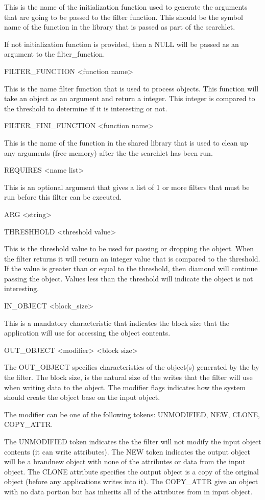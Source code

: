 This is the name of the initialization function used
to generate the arguments that are going to be passed to
the filter function.  This should be the symbol name of the 
function in the library that is passed as part of the searchlet.

If not initialization function is provided, then a
NULL will be passed as an argument to the filter_function.

FILTER_FUNCTION <function name>

This is the name filter function that is used
to process objects.  This function will take an 
object as an argument and return a integer.  This 
integer is compared to the threshold to determine if it
is interesting or not.


FILTER_FINI_FUNCTION <function name>

This is the name of the function in the shared library that is used
to clean up any arguments (free memory) after the the searchlet
has been run.  


REQUIRES <name list>

This is an optional argument that gives a list of 1 or more
filters that must be run before this filter can be executed.

ARG	<string>




THRESHHOLD  <threshold value>

This is the threshold value to be used for passing or dropping the object.
When the filter returns it will return an integer value that is compared
to the threshold.  If the value is greater than or equal to the threshold,
then diamond will continue passing the object.  Values less than
the threshold will indicate the object is not interesting.


IN_OBJECT	<block_size>

This is a mandatory characteristic that indicates the block size that
the application will use for accessing the object contents.

OUT_OBJECT	<modifier>	<block size>

The OUT_OBJECT specifies characteristics of the object(s) generated by the 
by the filter.  The block size, is the natural size of the writes
that the filter will use when writing data to the object. The 
modifier flags indicates how the system should create the object
base on the input object.   


The modifier can be one of the following tokens: UNMODIFIED, NEW, CLONE,
COPY_ATTR.

The UNMODIFIED token indicates the the filter will not modify
the input object contents (it can write attributes).  The
NEW token indicates the output object will be a brandnew object with
none of the attributes or data from the input object.
The CLONE attribute specifies the output object is a copy
of the original object (before any applications writes into
it).  The COPY_ATTR give an object with no data portion but
has inherits all of the attributes from in input object. 

